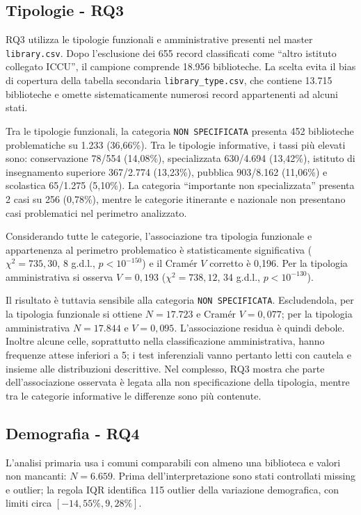 \documentclass[11pt,a4paper]{article}
\begin{document}
\subsection{Tipologie - RQ3}
RQ3 utilizza le tipologie funzionali e amministrative presenti nel master \texttt{library.csv}. Dopo l'esclusione dei 655 record classificati come ``altro istituto collegato ICCU'', il campione comprende 18.956 biblioteche. La scelta evita il bias di copertura della tabella secondaria \texttt{library\_type.csv}, che contiene 13.715 biblioteche e omette sistematicamente numerosi record appartenenti ad alcuni stati.

Tra le tipologie funzionali, la categoria \texttt{NON SPECIFICATA} presenta 452 biblioteche problematiche su 1.233 (36,66\%). Tra le tipologie informative, i tassi più elevati sono: conservazione 78/554 (14,08\%), specializzata 630/4.694 (13,42\%), istituto di insegnamento superiore 367/2.774 (13,23\%), pubblica 903/8.162 (11,06\%) e scolastica 65/1.275 (5,10\%). La categoria ``importante non specializzata'' presenta 2 casi su 256 (0,78\%), mentre le categorie itinerante e nazionale non presentano casi problematici nel perimetro analizzato.

Considerando tutte le categorie, l'associazione tra tipologia funzionale e appartenenza al perimetro problematico è statisticamente significativa ($\chi^2=735{,}30$, 8 g.d.l., $p<10^{-150}$) e il Cramér $V$ corretto è 0,196. Per la tipologia amministrativa si osserva $V=0{,}193$ ($\chi^2=738{,}12$, 34 g.d.l., $p<10^{-130}$).

Il risultato è tuttavia sensibile alla categoria \texttt{NON SPECIFICATA}. Escludendola, per la tipologia funzionale si ottiene $N=17.723$ e Cramér $V=0{,}077$; per la tipologia amministrativa $N=17.844$ e $V=0{,}095$. L'associazione residua è quindi debole. Inoltre alcune celle, soprattutto nella classificazione amministrativa, hanno frequenze attese inferiori a 5; i test inferenziali vanno pertanto letti con cautela e insieme alle distribuzioni descrittive. Nel complesso, RQ3 mostra che parte dell'associazione osservata è legata alla non specificazione della tipologia, mentre tra le categorie informative le differenze sono più contenute.

\subsection{Demografia - RQ4}
L'analisi primaria usa i comuni comparabili con almeno una biblioteca e valori non mancanti: $N=6.659$. Prima dell'interpretazione sono stati controllati missing e outlier; la regola IQR identifica 115 outlier della variazione demografica, con limiti circa $[-14{,}55\%, 9{,}28\%]$.
\end{document}
